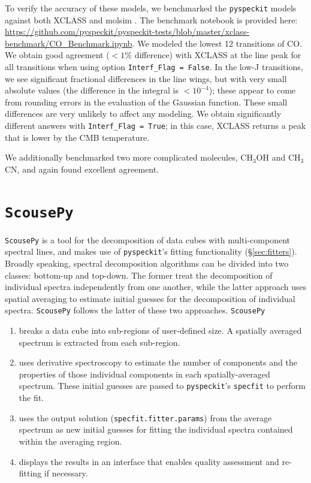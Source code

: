 \documentclass[twocolumn,linenumbers]{aastex63}
\newcommand{\pyspeckit}{\texttt{pyspeckit}\xspace}
\begin{document}
To verify the accuracy of these models, we benchmarked the \pyspeckit models against both XCLASS \citep{Moller2017} and molsim \citep{Lee2021}.
The benchmark notebook is provided here: \url{https://github.com/pyspeckit/pyspeckit-tests/blob/master/xclass-benchmark/CO_Benchmark.ipynb}.
We modeled the lowest 12 transitions of CO.
We obtain good agreement ($<1\%$ difference) with XCLASS at the line peak for all transitions when using option \texttt{Interf\_Flag = False}.
In the low-J transitions, we see significant fractional differences in the line wings, but with very small absolute values (the difference in the integral is $<10^{-4}$); these appear to come from rounding errors in the evaluation of the Gaussian function.
These small differences are very unlikely to affect any modeling.
We obtain significantly different answers with \texttt{Interf\_Flag = True}; in this case, XCLASS returns a peak that is lower by the CMB temperature.

We additionally benchmarked two more complicated molecules, CH$_3$OH and CH$_3$CN, and again found excellent agreement.


\section{\texttt{ScousePy}}
\label{appendix:scouse}

\texttt{ScousePy} is a tool for the decomposition of data cubes with multi-component spectral lines, and makes use of \pyspeckit's fitting functionality (\S \ref{sec:fitters}). Broadly speaking, spectral decomposition algorithms can be divided into two classes: bottom-up and top-down. The former treat the decomposition of individual spectra independently from one another, while the latter approach uses spatial averaging to estimate initial guesses for the decomposition of individual spectra. \texttt{ScousePy} follows the latter of these two approaches.  \texttt{ScousePy}
\begin{enumerate}
    \item 
breaks a data cube into sub-regions of user-defined size.  A spatially averaged spectrum is extracted from each sub-region. 
    \item uses  derivative spectroscopy to estimate the number of components and the properties of those individual components in each spatially-averaged spectrum. These initial guesses are passed to \pyspeckit's \texttt{specfit} to perform the fit. 
    \item uses the output solution (\texttt{specfit.fitter.params}) from the average spectrum as new initial guesses for fitting the individual spectra contained within the averaging region.
    \item displays the results in an interface that enables quality assessment and re-fitting if necessary.
\end{enumerate}
\end{document}
